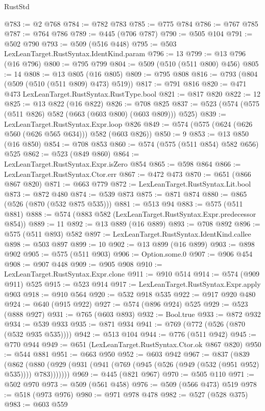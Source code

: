 \begin{lexlean}{RustStd}
\begin{coremodule}
@783 := @2 @768
@784 := @782 @783
@785 := @775 @784
@786 := @767 @785
@787 := @764 @786
@789 := @445 (@706 @787)
@790 := @505 @104
@791 := @502 @790
@793 := @509 (@516 @448)
@795 := @503 LexLeanTarget.RustSyntax.IdentKind.param
@796 := 13
@799 := @13 @796 (@16 @796)
@800 := @795 @799
@804 := @509 (@510 (@511 @800) @456)
@805 := 14
@808 := @13 @805 (@16 @805)
@809 := @795 @808
@816 := @793 (@804 (@509 (@510 (@511 @809) @473) @519))
@817 := @791 @816
@820 := @471 @473 LexLeanTarget.RustSyntax.RustType.bool
@821 := @817 @820
@822 := 12
@825 := @13 @822 (@16 @822)
@826 := @708 @825
@837 := @523 (@574 (@575 (@511 @826) @582 (@663 (@603 @800) (@603 @809))) @525)
@839 := LexLeanTarget.RustSyntax.Expr.loop @826
@849 := @574 (@575 (@624 (@626 @560 (@626 @565 @634))) @582 (@603 @826))
@850 := 9
@853 := @13 @850 (@16 @850)
@854 := @708 @853
@860 := @574 (@575 (@511 @854) @582 @656) @525
@862 := @523 (@849 @860)
@864 := LexLeanTarget.RustSyntax.Expr.isZero @854
@865 := @598 @864
@866 := LexLeanTarget.RustSyntax.Ctor.err
@867 := @472 @473
@870 := @651 (@866 @867 @820)
@871 := @663 @779
@872 := LexLeanTarget.RustSyntax.Lit.bool
@873 := @872 @480
@874 := @539 @873
@875 := @871 @874
@880 := @865 (@526 (@870 (@532 @875 @535)))
@881 := @513 @94
@883 := @575 (@511 @881)
@888 := @574 (@883 @582 (LexLeanTarget.RustSyntax.Expr.predecessor @854))
@889 := 11
@892 := @13 @889 (@16 @889)
@893 := @708 @892
@896 := @575 (@511 @893) @582
@897 := LexLeanTarget.RustSyntax.IdentKind.callee
@898 := @503 @897
@899 := 10
@902 := @13 @899 (@16 @899)
@903 := @898 @902
@905 := @575 (@511 @903)
@906 := Option.some.{0}
@907 := @906 @454
@908 := @907 @448
@909 := @905 @908
@910 := LexLeanTarget.RustSyntax.Expr.clone
@911 := @910 @514
@914 := @574 (@909 @911) @525
@915 := @523 @914
@917 := LexLeanTarget.RustSyntax.Expr.apply @903
@918 := @910 @564
@920 := @532 @918 @535
@922 := @917 @920 @480
@924 := @640 (@915 @922)
@927 := @574 (@896 @924) @525
@929 := @523 (@888 @927)
@931 := @765 (@603 @893)
@932 := Bool.true
@933 := @872 @932
@934 := @539 @933
@935 := @871 @934
@941 := @769 (@772 (@526 (@870 (@532 @935 @535))))
@942 := @513 @104
@944 := @776 (@511 @942)
@945 := @770 @944
@949 := @651 (LexLeanTarget.RustSyntax.Ctor.ok @867 @820)
@950 := @544 @881
@951 := @663 @950
@952 := @603 @942
@967 := @837
    (@839
      (@862 (@880 (@929 (@931 (@941 (@769 (@945 (@526 (@949 (@532 (@951 @952) @535)))) @783)))))))
@969 := @445 (@821 @967)
@970 := @505 @110
@971 := @502 @970
@973 := @509 (@561 @458)
@976 := @509 (@566 @473) @519
@978 := @518 (@973 @976)
@980 := @971 @978 @478
@982 := @527 (@528 @375)
@983 := @603 @559

\end{coremodule}
\end{lexlean}
